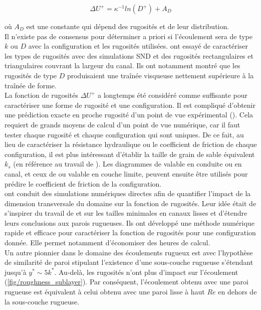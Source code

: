 \begin{equation}
	\Delta U^{+} = \kappa^{-1} ln(D^{+}) + A_{D}
	\label{eq/roughness_function_D}
\end{equation}

où $A_{D}$ est une constante qui dépend des rugosités et de leur distribution.\\

Il n'existe pas de consensus pour déterminer a priori si l'écoulement sera de type $k$ ou $D$ avec la configuration et les rugosités utilisées. \cite{Leonardi2007} ont essayé de caractériser les types de rugosités avec des simulations SND et des rugosités rectangulaires et triangulaires couvrant la largeur du canal. Ils ont notamment montré que les rugosités de type $D$ produisaient une traînée visqueuse nettement supérieure à la traînée de forme.\\

La fonction de rugosités $\Delta U^{+}$ a longtemps été considéré comme suffisante pour caractériser une forme de rugosité et une configuration. Il est compliqué d'obtenir une prédiction exacte en proche rugosité d'un point de vue expérimental (\cite{Bakken2005}). Cela requiert de grands moyens de calcul d'un point de vue numérique, car il faut tester chaque rugosité et chaque configuration qui sont uniques. De ce fait, au lieu de caractériser la résistance hydraulique ou le coefficient de friction de chaque configuration, il est plus intéressant d'établir la taille de grain de sable équivalent $k_{s}$ (en référence au travail de \cite{Nikuradse1933}). Les diagrammes de \cite{Moody1944} valable en conduite ou en canal, et ceux de \cite{Prandtl1955} ou \cite{Granville1958} valable en couche limite, peuvent ensuite être utilisés pour prédire le coefficient de friction de la configuration.\\

\cite{Chung2015} ont conduit des simulations numériques directes afin de quantifier l'impact de la dimension transversale du domaine sur la fonction de rugosités. Leur idée était de s'inspirer du travail de \cite{Jimenez1991} et \cite{Flores2010} sur les tailles minimales en canaux lisses et d'étendre leurs conclusions aux parois rugueuses. Ils ont développé une méthode numérique rapide et efficace pour caractériser la fonction de rugosités pour une configuration donnée. Elle permet notamment d'économiser des heures de calcul.\\   

Un autre pionnier dans le domaine des écoulements rugueux est \cite{Townsend1976} avec l'hypothèse de similarité de paroi stipulant l'existence d'une sous-couche rugueuse s'étendant jusqu'à $y^{*} \sim 5 k^{*}$. Au-delà, les rugosités n'ont plus d'impact sur l'écoulement (\cref{fig/roughness_sublayer}). Par conséquent, l'écoulement obtenu avec une paroi rugueuse est équivalent à celui obtenu avec une paroi lisse à haut $Re$ en dehors de la sous-couche rugueuse.\\

